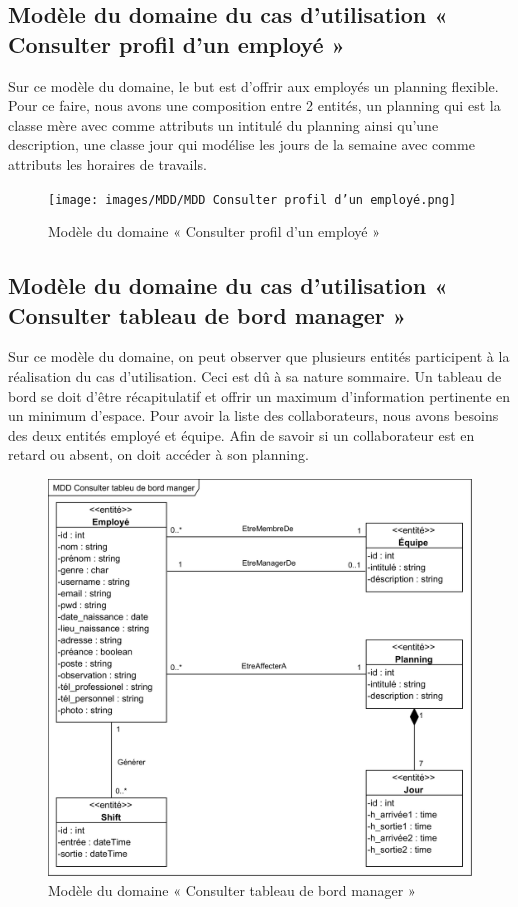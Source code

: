 \subsection*{Modèle du domaine du cas d'utilisation « Consulter profil d'un employé »}
Sur ce modèle du domaine, le but est d’offrir aux employés un planning 
flexible. Pour ce faire, nous avons une composition entre 2 entités, un planning 
qui est la classe mère avec comme attributs un intitulé du planning 
ainsi qu’une description, une classe jour qui modélise les jours de la semaine 
avec comme attributs les horaires de travails.

\clearpage

\begin{figure}[h!]
    \centering
    \texttt{[image: images/MDD/MDD Consulter profil d'un employé.png]}
    \caption{Modèle du domaine « Consulter profil d'un employé »}
    \label{fig18}
\end{figure}
            
\subsection*{Modèle du domaine du cas d'utilisation « Consulter tableau de bord manager »}
Sur ce modèle du domaine, on peut observer que plusieurs entités participent 
à la réalisation du cas d’utilisation. Ceci est dû à sa nature sommaire.
Un tableau de bord se doit d’être récapitulatif et offrir un maximum 
d’information pertinente en un minimum d’espace. Pour avoir la liste 
des collaborateurs, nous avons besoins des deux entités employé et équipe. 
Afin de savoir si un collaborateur est en retard ou absent, on doit accéder 
à son planning. 

 \begin{figure}[h!]
    \centering
    \includegraphics[scale=1.06]{images/MDD/MDD Consulter tableu de bord manger.png}
    \caption{Modèle du domaine « Consulter tableau de bord manager »}
    \label{fig19}
\end{figure}
            
